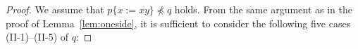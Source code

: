 \begin{proof}
We assume that $p \{ x := xy \} \not\preceq q$ holds. 
%
%
%
%
From the same argument as in the proof of Lemma~\ref{lem:oneside}, it is sufficient to consider the following five cases (II-1)--(II-5) of $q$:


\end{proof}
